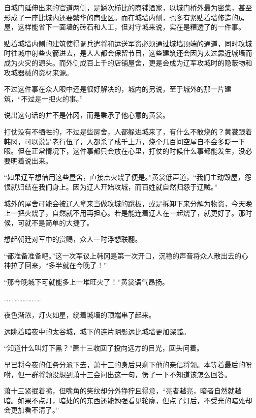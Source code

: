 自城门延伸出来的官道两侧，是鳞次栉比的商铺酒家，以城门桥外最为密集，甚至形成了一座比城内还要繁华的商业区。而在城墙内侧，也多有紧贴着墙修造的房屋，这样能省下一面墙的砖石和人工，但对守城来说，实在是糟透了的一件事。

贴着城墙内侧的建筑使得调兵遣将和运送军资必须通过城墙顶端的通道，同时攻城时往城中射些火箭进去，是人人都会保留节目，这些建筑还会因为太过靠近城墙而成为火灾的源头。而外侧成百上千的店铺屋舍，更是会成为辽军攻城时的隐蔽物和攻城器械的资材来源。

不过这件事在众人眼中还是很好解决的，城内的另说，至于城外的那一片建筑，“不过是一把火的事。”

说出这句话的并不是韩冈，而是秉承了他心意的黄裳。

打仗没有不牺牲的，不过是些房舍，人都躲进城来了，有什么不敢烧的？黄裳跟着韩冈，可以说是老行伍了，人都杀了成千上万，烧个几百间空屋自不会多眨一下眼。但在正常情况下，这件事都只会放在心里，打仗的时候什么事都能发生，没必要明着说出来。

“如果辽军想借用这些屋舍，直接点火烧了便是。”黄裳低声道，“我们主动毁屋，怨恨就归结在我们身上。因为辽人开始攻城，而百姓就自然归怨于辽贼。”

城外的屋舍可能会被辽人拿来当做攻城的跳板，或是拆卸下来分解为物资，今天晚上一把火烧了，自然就不用再担心。若是能连着辽人在一起烧了，就更好了。那时候，可就不是简单的大捷了。

想起朝廷对军中的赏赐，众人一时浮想联翩。

“都准备准备吧。”这一次军议上韩冈是第一次开口，沉稳的声音将众人散出去的心神拉了回来，“多半就在今晚了！”

“那今晚城下可就能多上一堆旺火了！”黄裳语气昂扬。

……………………

夜色渐浓，灯火如星，绕着城墙的顶端串了起来。

远眺着暗夜中的太谷城，城下的连片阴影远比城墙更加深黯。

“知道什么叫灯下黑？”萧十三收回了投向远方的目光，回头问着。

早已将今夜的任务分派下去，萧十三的身后只剩下他的亲信将领。本等着最后的吩咐，但一群将领没想到萧十三会问出这一句，愣了一下不知道该怎么回答。

萧十三紧抿着嘴，但嘴角的笑纹却分外狰狞且得意，“亮者越亮，暗者自然就越暗。如果不点灯，暗处的的东西还能勉强看见轮廓，但点了灯后，不受光的暗处却会更加看不清了。”
